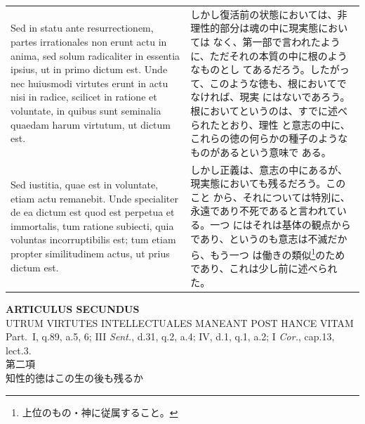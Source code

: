\documentclass[paper=a4paper,fontsize=10pt,jafontsize=9pt,titlepage]{jlreq}
\begin{document}
\begin{longtable}{p{21em}p{21em}}
\\

 Sed in statu ante resurrectionem,
 partes irrationales non erunt actu in anima, sed solum radicaliter in
 essentia ipsius, ut in primo dictum est. Unde nec huiusmodi virtutes
 erunt in actu nisi in radice, scilicet in ratione et voluntate, in
 quibus sunt seminalia quaedam harum virtutum, ut dictum est.

 
&

 しかし復活前の状態においては、非理性的部分は魂の中に現実態においては
 なく、第一部で言われたように、ただそれの本質の中に根のようなものとし
 てあるだろう。したがって、このような徳も、根においてでなければ、現実
 にはないであろう。根においてというのは、すでに述べられたとおり、理性
 と意志の中に、これらの徳の何らかの種子のようなものがあるという意味で
 ある。

\\


 Sed iustitia, quae est in voluntate, etiam actu remanebit. Unde
 specialiter de ea dictum est quod est perpetua et immortalis, tum
 ratione subiecti, quia voluntas incorruptibilis est; tum etiam
 propter similitudinem actus, ut prius dictum est.

 
&

 しかし正義は、意志の中にあるが、現実態においても残るだろう。このこと
 から、それについては特別に、永遠であり不死であると言われている。一つ
 にはそれは基体の観点からであり、というのも意志は不滅だから、もう一つ
 は働きの類似\footnote{上位のもの・神に従属すること。}のためであり、これは少し前に述べられた。

\end{longtable}
\newpage




\begin{center}
{\Large {\bfseries ARTICULUS SECUNDUS}}\\
{\large UTRUM VIRTUTES INTELLECTUALES MANEANT POST HANCE VITAM}\\
{\footnotesize Part.~I, q.89, a.5, 6; III {\itshape Sent.}, d.31, q.2, a.4; IV, d.1, q.1, a.2; I {\itshape Cor.}, cap.13, lect.3.}\\
{\Large 第二項\\知性的徳はこの生の後も残るか}
\end{center}
\end{document}
